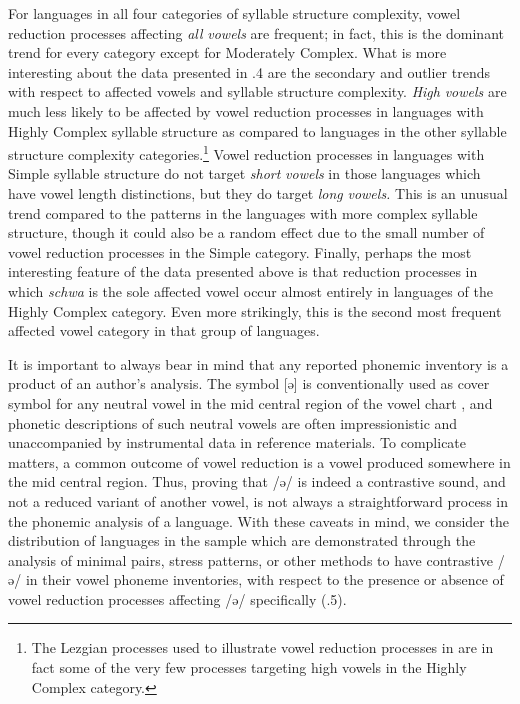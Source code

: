  For languages in all four categories of syllable structure complexity, vowel reduction processes affecting \textit{all} \textit{vowels} are frequent; in fact, this is the dominant trend for every category except for Moderately Complex. What is more interesting about the data presented in .4 are the secondary and outlier trends with respect to affected vowels and syllable structure complexity. \textit{High} \textit{vowels} are much less likely to be affected by vowel reduction processes in languages with Highly Complex syllable structure as compared to languages in the other syllable structure complexity categories.\footnote{ \textrm{The Lezgian processes used to illustrate vowel reduction processes in  are in fact some of the very few processes targeting high vowels in the Highly Complex category.}} Vowel reduction processes in languages with Simple syllable structure do not target \textit{short} \textit{vowels} in those languages which have vowel length distinctions, but they do target \textit{long} \textit{vowels.} This is an unusual trend compared to the patterns in the languages with more complex syllable structure, though it could also be a random effect due to the small number of vowel reduction processes in the Simple category. Finally, perhaps the most interesting feature of the data presented above is that reduction processes in which \textit{schwa} is the sole affected vowel occur almost entirely in languages of the Highly Complex category. Even more strikingly, this is the second most frequent affected vowel category in that group of languages.

  It is important to always bear in mind that any reported phonemic inventory is a product of an author’s analysis. The symbol [ə] is conventionally used as cover symbol for any neutral vowel in the mid central region of the vowel chart \citep[280]{Laver1994}, and phonetic descriptions of such neutral vowels are often impressionistic and unaccompanied by instrumental data in reference materials. To complicate matters, a common outcome of vowel reduction is a vowel produced somewhere in the mid central region. Thus, proving that /ə/ is indeed a contrastive sound, and not a reduced variant of another vowel, is not always a straightforward process in the phonemic analysis of a language. With these caveats in mind, we consider the distribution of languages in the sample which are demonstrated through the analysis of minimal pairs, stress patterns, or other methods to have contrastive /ə/ in their vowel phoneme inventories, with respect to the presence or absence of vowel reduction processes affecting /ə/ specifically (.5).


